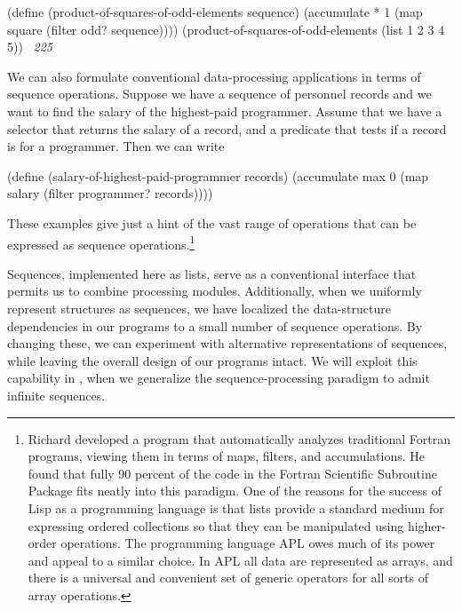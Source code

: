 \begin{codeBlock}
(define (product-of-squares-of-odd-elements sequence)
  (accumulate * 1 (map
                   square
                   (filter odd? sequence))))
(product-of-squares-of-odd-elements
  (list 1 2 3 4 5))
~\textit{225}~
\end{codeBlock}

\noindent
We can also formulate conventional data-processing applications in terms of
sequence operations.  Suppose we have a sequence of personnel records and we
want to find the salary of the highest-paid programmer.  Assume that we have a
selector  that returns the salary of a record, and a predicate
 that tests if a record is for a programmer.  Then we can
write

\begin{codeBlock}
(define (salary-of-highest-paid-programmer records)
  (accumulate max 0 (map
                     salary
                     (filter programmer? records))))
\end{codeBlock}

\noindent
These examples give just a hint of the vast range of operations that can be
expressed as sequence operations.\footnote{Richard  developed a
program that automatically analyzes traditional Fortran programs, viewing them
in terms of maps, filters, and accumulations.  He found that fully 90 percent
of the code in the Fortran Scientific Subroutine Package fits neatly into this
paradigm.  One of the reasons for the success of Lisp as a programming language
is that lists provide a standard medium for expressing ordered collections so
that they can be manipulated using higher-order operations.  The programming
language APL owes much of its power and appeal to a similar choice. In APL all
data are represented as arrays, and there is a universal and convenient set of
generic operators for all sorts of array operations.}

Sequences, implemented here as lists, serve as a conventional interface that
permits us to combine processing modules.  Additionally, when we uniformly
represent structures as sequences, we have localized the data-structure
dependencies in our programs to a small number of sequence operations.  By
changing these, we can experiment with alternative representations of
sequences, while leaving the overall design of our programs intact.  We will
exploit this capability in , when we generalize the
sequence-processing paradigm to admit infinite sequences.

